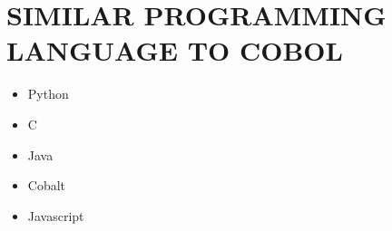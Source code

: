 \documentclass{article}
\begin{document}
	\section*{SIMILAR PROGRAMMING LANGUAGE TO COBOL}
	\begin{itemize}
		\item Python
		\item C
		\item Java
		\item Cobalt
		\item Javascript
	\end{itemize}
\end{document}
